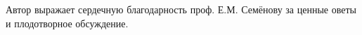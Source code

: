 \documentclass{article}
\theoremstyle{plain}
\theoremstyle{definition}
\begin{document}
\begin{fulltext}
Автор выражает сердечную благодарность проф. Е.М. Семёнову за ценные оветы и плодотворное обсуждение.
\end{fulltext}




\printbibliography{}
\end{document}
